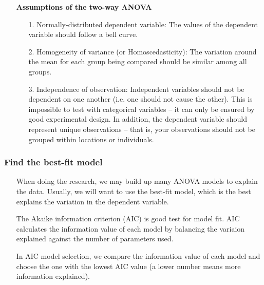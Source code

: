 \documentclass[a4paper]{article}
\begin{document}
\begin{itemize}
    \item[] \textbf{Assumptions of the two-way ANOVA}
    \begin{itemize}
        \item[1.] Normally-distributed dependent variable: The values of the dependent variable should follow a bell curve.
    
        \item [2.] Homogeneity of variance (or Homoscedasticity): The variation around the mean for each group being compared should be similar among all groups. 
        
        \item[3.] Independence of observation: Independent variables should not be dependent on one another (i.e. one should not cause the other). This is impossible to test with categorical variables – it can only be ensured by good experimental design. In addition, the dependent variable should represent unique observations – that is, your observations should not be grouped within locations or individuals. 
    \end{itemize}
\end{itemize}

\subsubsection{Find the best-fit model}
\begin{itemize}
    
    \item[] When doing the research, we may build up many ANOVA models to explain the data. Usually, we will want to use the best-fit model, which is the best explains the variation in the dependent variable.
    
    \item[] The Akaike information criterion (AIC) is good test for model fit. AIC calculates the information value of each model by balancing the variaion explained against the number of parameters used.
    
    \item[] In AIC model selection, we compare the information value of each model and choose the one with the lowest AIC value (a lower number means more information explained).
\end{itemize}
\end{document}
